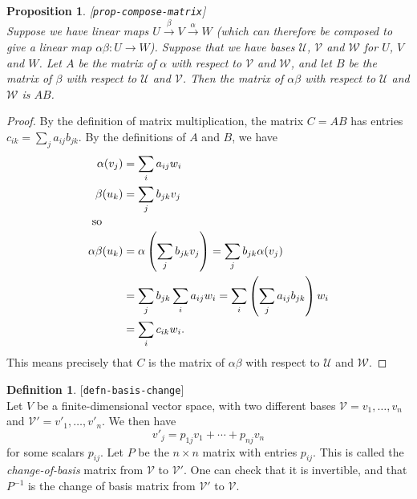 \documentclass{amsart}
\newcommand{\lbl}[1]{\label{#1}\textup{[\texttt{#1}]}\ \\}
\newcommand{\lbl}{\label}
\newcommand{\al}        {\alpha}
\newcommand{\bt}        {\beta}
\newcommand{\tm}        {\times}
\newcommand{\xra}       {\xrightarrow}
\newcommand{\CU}        {{\mathcal{U}}}
\newcommand{\CV}        {{\mathcal{V}}}
\newcommand{\CW}        {{\mathcal{W}}}
\renewcommand{\:}       {\colon}
\newtheorem{proposition}[theorem]{Proposition}
\theoremstyle{definition}
\newtheorem{definition}[theorem]{Definition}
\begin{document}
\begin{proposition}\lbl{prop-compose-matrix}
 Suppose we have linear maps $U\xra{\bt}V\xra{\al}W$ (which
 can therefore be composed to give a linear map
 $\al\bt\:U\xra{}W$).  Suppose that we have bases $\CU$,
 $\CV$ and $\CW$ for $U$, $V$ and $W$.  Let $A$ be the
 matrix of $\al$ with respect to $\CV$ and $\CW$, and let
 $B$ be the matrix of $\bt$ with respect to $\CU$ and
 $\CV$.  Then the matrix of $\al\bt$ with respect to $\CU$
 and $\CW$ is $AB$.
\end{proposition}
\begin{proof}
 By the definition of matrix multiplication, the matrix
 $C=AB$ has entries $c_{ik}=\sum_ja_{ij}b_{jk}$.  By the
 definitions of $A$ and $B$, we have
 \begin{align*}
  \al(v_j) &= \sum_i a_{ij}w_i \\
  \bt(u_k) &= \sum_j b_{jk}v_j \\
  \intertext{ so }
  \al\bt(u_k) &= \al\left(\sum_j b_{jk}v_j\right) 
     = \sum_j b_{jk}\al(v_j) \\
    &= \sum_j b_{jk} \sum_i a_{ij} w_i 
     = \sum_i \left(\sum_j a_{ij}b_{jk}\right) w_i \\
    &= \sum_i c_{ik} w_i.
 \end{align*}
 This means precisely that $C$ is the matrix of $\al\bt$
 with respect to $\CU$ and $\CW$.
\end{proof}

\begin{definition}\lbl{defn-basis-change}
 Let $V$ be a finite-dimensional vector space, with two
 different bases $\CV=v_1,\dotsc,v_n$ and
 $\CV'=v'_1,\dotsc,v'_n$.  We then have  
 \[ v'_j = p_{1j}v_1 + \dotsb + p_{nj}v_n \]
 for some scalars $p_{ij}$.  Let $P$ be the $n\tm n$ matrix
 with entries $p_{ij}$.  This is called the
 \emph{change-of-basis} matrix from $\CV$ to $\CV'$.  One
 can check that it is invertible, and that $P^{-1}$ is the
 change of basis matrix from $\CV'$ to $\CV$.
\end{definition}
\end{document}
